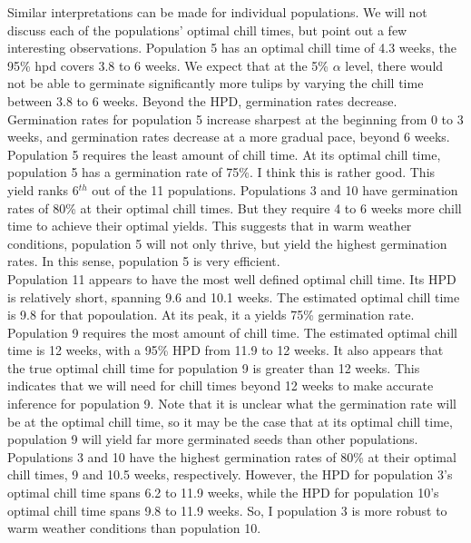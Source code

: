 \documentclass[mathserif]{article}
\begin{document}
\noindent
Similar interpretations can be made for individual populations. We will not
discuss each of the populations' optimal chill times, but point out a few
interesting observations. Population 5 has an optimal chill time of 4.3 weeks,
the 95\% hpd covers 3.8 to 6 weeks. We expect that at the 5\% $\alpha$ level,
there would not be able to germinate significantly more tulips by varying the
chill time between 3.8 to 6 weeks. Beyond the HPD, germination rates decrease.
Germination rates for population 5 increase sharpest at the beginning from 0 to
3 weeks, and germination rates decrease at a more gradual pace, beyond 6 weeks.
Population 5 requires the least amount of chill time. At its optimal chill
time, population 5 has a germination rate of 75\%. I think this is rather good.
This yield ranks 6$^{th}$ out of the 11 populations. Populations 3 and 10 have
germination rates of 80\% at their optimal chill times. But they require 4 to 6
weeks more chill time to achieve their optimal yields. This suggests that
in warm weather conditions, population 5 will not only thrive, but yield the
highest germination rates. In this sense, population 5 is very efficient.\\

\noindent
Population 11 appears to have the most well defined optimal chill time. Its HPD
is relatively short, spanning 9.6 and 10.1 weeks. The estimated optimal chill
time is 9.8 for that popoulation. At its peak, it a yields 75\% germination rate.\\

\noindent
Population 9 requires the most amount of chill time. The estimated optimal chill time
is 12 weeks, with a 95\% HPD from 11.9 to 12 weeks. It also appears that
the true optimal chill time for population 9 is greater than 12 weeks.
This indicates that we will need for chill times beyond 12 weeks to make
accurate inference for population 9. Note that it is unclear what the
germination rate will be at the optimal chill time, so it may be the 
case that at its optimal chill time, population 9 will yield far more 
germinated seeds than other populations.\\

\noindent
Populations 3 and 10 have the highest germination rates of 80\% at their optimal chill times,
9 and 10.5 weeks, respectively. However, the HPD for population 3's optimal chill time
spans 6.2 to 11.9 weeks, while the HPD for population 10's optimal chill time spans
9.8 to 11.9 weeks. So, I population 3 is more robust to warm weather conditions
than population 10.\\
\end{document}
